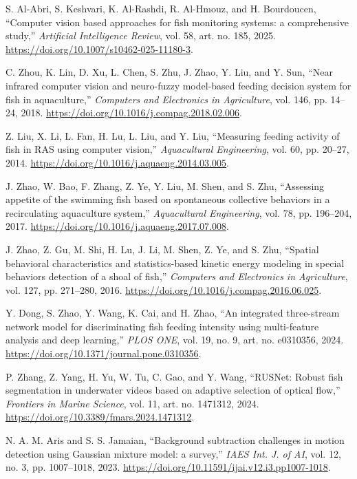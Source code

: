 \documentclass[11pt,a4paper]{article}
\begin{document}
{\begin{enumerate}[label={[\arabic*]}, leftmargin=2em]
    \item S. Al-Abri, S. Keshvari, K. Al-Rashdi, R. Al-Hmouz, and H. Bourdoucen, ``Computer vision based approaches for fish monitoring systems: a comprehensive study,'' \textit{Artificial Intelligence Review}, vol. 58, art. no. 185, 2025. \url{https://doi.org/10.1007/s10462-025-11180-3}.
    \item C. Zhou, K. Lin, D. Xu, L. Chen, S. Zhu, J. Zhao, Y. Liu, and Y. Sun, ``Near infrared computer vision and neuro-fuzzy model-based feeding decision system for fish in aquaculture,'' \textit{Computers and Electronics in Agriculture}, vol. 146, pp. 14--24, 2018. \url{https://doi.org/10.1016/j.compag.2018.02.006}.
    \item Z. Liu, X. Li, L. Fan, H. Lu, L. Liu, and Y. Liu, ``Measuring feeding activity of fish in RAS using computer vision,'' \textit{Aquacultural Engineering}, vol. 60, pp. 20--27, 2014. \url{https://doi.org/10.1016/j.aquaeng.2014.03.005}.
    \item J. Zhao, W. Bao, F. Zhang, Z. Ye, Y. Liu, M. Shen, and S. Zhu, ``Assessing appetite of the swimming fish based on spontaneous collective behaviors in a recirculating aquaculture system,'' \textit{Aquacultural Engineering}, vol. 78, pp. 196--204, 2017. \url{https://doi.org/10.1016/j.aquaeng.2017.07.008}.
    \item J. Zhao, Z. Gu, M. Shi, H. Lu, J. Li, M. Shen, Z. Ye, and S. Zhu, ``Spatial behavioral characteristics and statistics-based kinetic energy modeling in special behaviors detection of a shoal of fish,'' \textit{Computers and Electronics in Agriculture}, vol. 127, pp. 271--280, 2016. \url{https://doi.org/10.1016/j.compag.2016.06.025}.
    \item Y. Dong, S. Zhao, Y. Wang, K. Cai, and H. Zhao, ``An integrated three-stream network model for discriminating fish feeding intensity using multi-feature analysis and deep learning,'' \textit{PLOS ONE}, vol. 19, no. 9, art. no. e0310356, 2024. \url{https://doi.org/10.1371/journal.pone.0310356}.
    \item P. Zhang, Z. Yang, H. Yu, W. Tu, C. Gao, and Y. Wang, ``RUSNet: Robust fish segmentation in underwater videos based on adaptive selection of optical flow,'' \textit{Frontiers in Marine Science}, vol. 11, art. no. 1471312, 2024. \url{https://doi.org/10.3389/fmars.2024.1471312}.
    \item N. A. M. Aris and S. S. Jamaian, ``Background subtraction challenges in motion detection using Gaussian mixture model: a survey,'' \textit{IAES Int. J. of AI}, vol. 12, no. 3, pp. 1007--1018, 2023. \url{https://doi.org/10.11591/ijai.v12.i3.pp1007-1018}.

\end{enumerate}}
\end{document}
